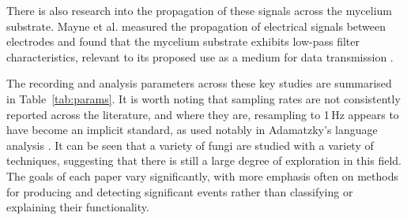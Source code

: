 There is also research into the propagation of these signals across the mycelium substrate. Mayne et al. \cite{mayne} measured the propagation of electrical signals between electrodes and found that the mycelium substrate exhibits low-pass filter characteristics, relevant to its proposed use as a medium for data transmission \cite{phillips}.

The recording and analysis parameters across these key studies are summarised in Table~\ref{tab:params}. It is worth noting that sampling rates are not consistently reported across the literature, and where they are, resampling to 1\,Hz appears to have become an implicit standard, as used notably in Adamatzky's language analysis \cite{adamatzky2022}. It can be seen that a variety of fungi are studied with a variety of techniques, suggesting that there is still a large degree of exploration in this field. The goals of each paper vary significantly, with more emphasis often on methods for producing and detecting significant events rather than classifying or explaining their functionality.

